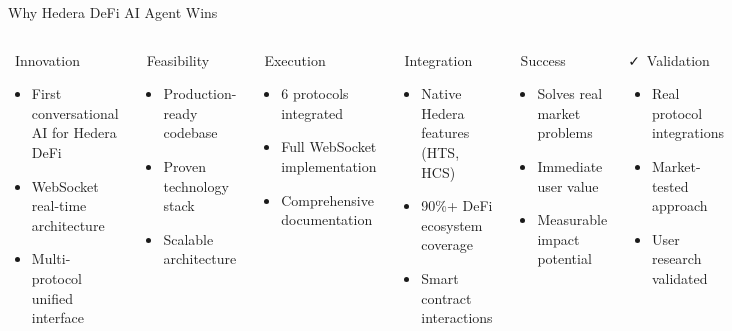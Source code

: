 \documentclass[aspectratio=169]{beamer}
\providecommand{\faCheckDouble}{\faCheck}
\begin{document}
\begin{frame}{Why Hedera DeFi AI Agent Wins}
\begin{columns}
\begin{block}{\faLightbulb\ Innovation}
\begin{itemize}
\item First conversational AI for Hedera DeFi
\item WebSocket real-time architecture
\item Multi-protocol unified interface
\end{itemize}
\end{block}

\begin{block}{\faCogs\ Feasibility}
\begin{itemize}
\item Production-ready codebase
\item Proven technology stack
\item Scalable architecture
\end{itemize}
\end{block}

\begin{block}{\faRocket\ Execution}
\begin{itemize}
\item 6 protocols integrated
\item Full WebSocket implementation
\item Comprehensive documentation
\end{itemize}
\end{block}

\begin{block}{\faPlug\ Integration}
\begin{itemize}
\item Native Hedera features (HTS, HCS)
\item 90\%+ DeFi ecosystem coverage
\item Smart contract interactions
\end{itemize}
\end{block}

\begin{block}{\faTrophy\ Success}
\begin{itemize}
\item Solves real market problems
\item Immediate user value
\item Measurable impact potential
\end{itemize}
\end{block}

\begin{block}{\faCheckDouble\ Validation}
\begin{itemize}
\item Real protocol integrations
\item Market-tested approach
\item User research validated
\end{itemize}
\end{block}
\end{columns}
\end{frame}
\end{document}
